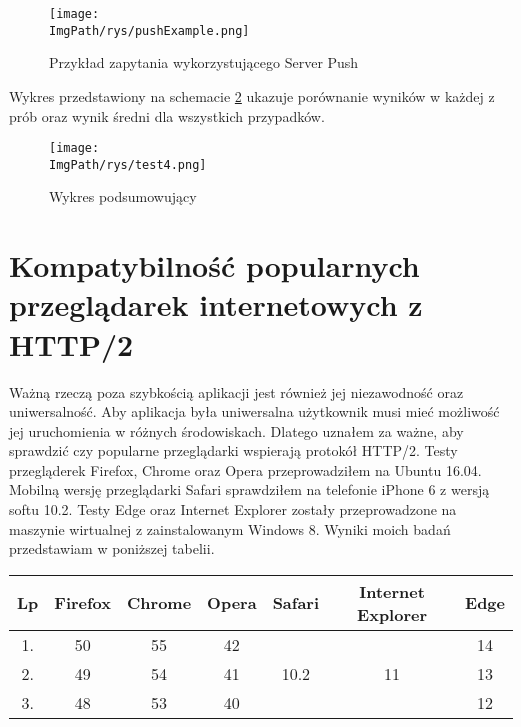 \documentclass[a4paper,12pt,twoside,openany]{report}
\newcommand{\ImgPath}{.}
\begin{document}
\begin{figure}[!htbp]
	\begin{center}
\centering
\texttt{[image: \\ImgPath/rys/pushExample.png]}
\end{center}
	\caption{Przykład zapytania wykorzystującego Server Push}
	\label{schematPushExample}
\end{figure}

Wykres przedstawiony na schemacie \ref{schematTest4} ukazuje porównanie wyników w każdej z prób oraz wynik średni dla wszystkich przypadków.

\begin{figure}[!htbp]
	\begin{center}
\centering
\texttt{[image: \\ImgPath/rys/test4.png]}
\end{center}
	\caption{Wykres podsumowujący}
	\label{schematTest4}
\end{figure}

\section{Kompatybilność popularnych przeglądarek internetowych z HTTP/2}

Ważną rzeczą poza szybkością aplikacji jest również jej niezawodność oraz uniwersalność.
Aby aplikacja była uniwersalna użytkownik musi mieć możliwość jej uruchomienia w różnych środowiskach.
Dlatego uznałem za ważne, aby sprawdzić czy popularne przeglądarki wspierają protokół HTTP/2.
Testy przegląderek Firefox, Chrome oraz Opera przeprowadziłem na Ubuntu 16.04.
Mobilną wersję przeglądarki Safari sprawdziłem na telefonie iPhone 6 z wersją softu 10.2.
Testy Edge oraz Internet Explorer zostały przeprowadzone na maszynie wirtualnej z zainstalowanym Windows 8.
Wyniki moich badań przedstawiam w poniższej tabelii.

\begin{tabular}{c|c|c|c|c|c|c}
Lp & Firefox & Chrome & Opera & Safari & Internet Explorer & Edge \\ \hline
1. & \cellcolor{green!50}50 & \cellcolor{green!50}55 & \cellcolor{green!50}42 & & & \cellcolor{green!50}14 \\

2. & \cellcolor{green!50}49 & \cellcolor{green!50}54 & \cellcolor{green!50}41 & \cellcolor{green!50}10.2 & \cellcolor{red!50}11 & \cellcolor{green!50}13 \\

3. & \cellcolor{green!50}48 & \cellcolor{green!50}53 & \cellcolor{green!50}40 & & & \cellcolor{green!50}12 \\
\end{tabular}
\end{document}
